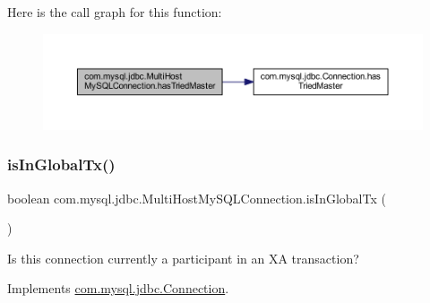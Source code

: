 Here is the call graph for this function\+:
\nopagebreak
\begin{figure}[H]
\begin{center}
\leavevmode
\includegraphics[width=350pt]{classcom_1_1mysql_1_1jdbc_1_1_multi_host_my_s_q_l_connection_a0c6bc4351473d95ef46999773702ed18_cgraph}
\end{center}
\end{figure}
\mbox{\label{classcom_1_1mysql_1_1jdbc_1_1_multi_host_my_s_q_l_connection_a7a8d4c611693701c71532835d4f1fffa}} 
\subsubsection{\texorpdfstring{is\+In\+Global\+Tx()}{isInGlobalTx()}}
{\footnotesize\ttfamily boolean com.\+mysql.\+jdbc.\+Multi\+Host\+My\+S\+Q\+L\+Connection.\+is\+In\+Global\+Tx (\begin{DoxyParamCaption}{ }\end{DoxyParamCaption})}

Is this connection currently a participant in an XA transaction? 

Implements \mbox{\hyperlink{interfacecom_1_1mysql_1_1jdbc_1_1_connection_a78a9a11946443467d3fbc7838922a205}{com.\+mysql.\+jdbc.\+Connection}}.

